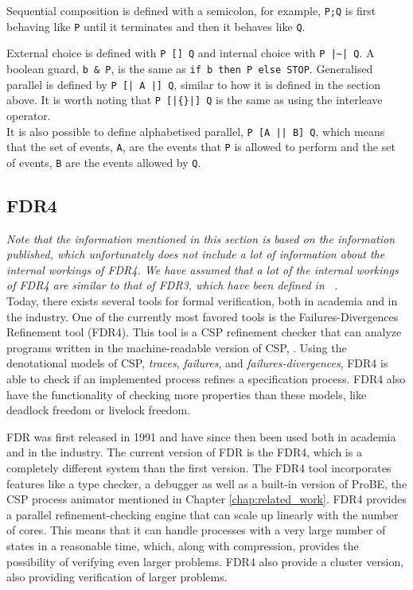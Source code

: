 Sequential composition is defined with a semicolon, for example, \texttt{P;Q} is first behaving like \texttt{P} until it terminates and then it behaves like \texttt{Q}.

External choice is defined with \texttt{P [] Q} and internal choice with \texttt{P |\textasciitilde| Q}. A boolean guard, \texttt{b \& P}, is the same as \texttt{if b then P else STOP}.
Generalised parallel is defined by \texttt{P [| A |] Q}, similar to how it is defined in the section above. It is worth noting that \texttt{P [|\{\}|] Q} is the same as using the interleave operator. \\
It is also possible to define alphabetised parallel, \texttt{P [A || B] Q}, which means that the set of events, \texttt{A}, are the events that \texttt{P} is allowed to perform and the set of events, \texttt{B} are the events allowed by \texttt{Q}.
%

\subsection{FDR4}
\label{sec:background_fdr}
\textit{Note that the information mentioned in this section is based on the information published, which unfortunately does not include a lot of information about the internal workings of FDR4. We have assumed that a lot of the internal workings of FDR4 are similar to that of FDR3, which have been defined in ~\cite{fdr}.}\\

Today, there exists several tools for formal verification, both in academia and in the industry. One of the currently most favored tools is the Failures-Divergences Refinement tool (FDR4). This tool is a CSP refinement checker that can analyze programs written in the machine-readable version of CSP, \cspm{}. Using the denotational models of CSP, \textit{traces}, \textit{failures}, and \textit{failures-divergences}, FDR4 is able to check if an implemented process refines a specification process. FDR4 also have the functionality of checking more properties than these models, like deadlock freedom or livelock freedom.

FDR was first released in 1991 and have since then been used both in academia and in the industry. The current version of FDR is the FDR4, which is a completely different system than the first version.
The FDR4 tool incorporates features like a \cspm{} type checker, a debugger as well as a built-in version of ProBE, the CSP process animator mentioned in Chapter \ref{chap:related_work}. FDR4 provides a parallel refinement-checking engine that can scale up linearly with the number of cores. This means that it can handle processes with a very large number of states in a reasonable time, which, along with compression, provides the possibility of verifying even larger problems. FDR4 also provide a cluster version, also providing verification of larger problems.\\

